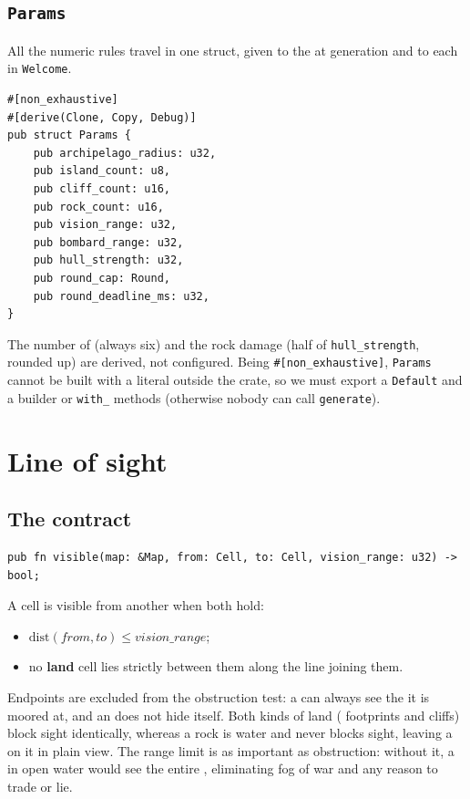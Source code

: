 \documentclass{article}
\begin{document}
\subsection{\texttt{Params}}
\label{proto:params}

All the numeric rules travel in one struct, given to the \chart{} at generation and to each \ship{} in \texttt{Welcome}. 

\begin{lstlisting}
#[non_exhaustive]
#[derive(Clone, Copy, Debug)]
pub struct Params {
    pub archipelago_radius: u32,
    pub island_count: u8,
    pub cliff_count: u16,
    pub rock_count: u16,
    pub vision_range: u32,
    pub bombard_range: u32,
    pub hull_strength: u32,
    pub round_cap: Round,
    pub round_deadline_ms: u32,
}
\end{lstlisting}

The number of \ships{} (always six) and the rock damage (half of \texttt{hull\_strength}, rounded up) are derived, not configured. Being \texttt{\#[non\_exhaustive]}, \texttt{Params} cannot be built with a literal outside the crate, so we must export a \texttt{Default} and a builder or \texttt{with\_} methods (otherwise nobody can call \texttt{generate}).

\newpage
\section{Line of sight}
\label{proto:los}

\subsection{The contract}

\begin{lstlisting}
pub fn visible(map: &Map, from: Cell, to: Cell, vision_range: u32) -> bool;
\end{lstlisting}

A cell is visible from another when both hold:

\begin{itemize}
    \item $\mathrm{dist}(\mathit{from}, \mathit{to}) \leq \mathit{vision\_range}$;
    \item no \textbf{land} cell lies strictly between them along the line joining them.
\end{itemize}

Endpoints are excluded from the obstruction test: a \ship{} can always see the \island{} it is
moored at, and an \island{} does not hide itself. Both kinds of land (\island{} footprints and
cliffs) block sight identically, whereas a rock is water and never blocks sight, leaving a \ship{}
on it in plain view. The range limit is as important as obstruction: without it, a \ship{} in open
water would see the entire \archipelago{}, eliminating fog of war and any reason to trade or lie.
\end{document}
